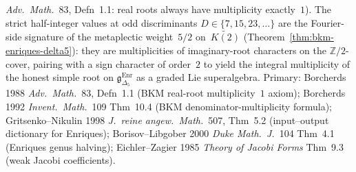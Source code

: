\begin{theorem}
\emph{Adv.~Math.}~83, Defn~1.1: real roots always have
multiplicity exactly~$1$). The strict half-integer values at
odd discriminants $D \in \{7, 15, 23, \ldots\}$ are the Fourier-side
signature of the metaplectic weight~$5/2$ on~$\widetilde{K(2)}$
(Theorem~\ref{thm:bkm-enriques-delta5}): they are multiplicities
of imaginary-root characters on the $\mathbb{Z}/2$-cover,
pairing with a sign character of order~$2$ to yield the integral
multiplicity of the honest simple root on
$\mathfrak{g}_{\Delta_5}^{\mathrm{Enr}}$ as a graded Lie superalgebra.
Primary:
Borcherds 1988 \emph{Adv.~Math.}~83, Defn~1.1 (BKM real-root
multiplicity~$1$ axiom);
Borcherds 1992 \emph{Invent.~Math.}~109 Thm~10.4 (BKM
denominator-multiplicity formula);
Gritsenko--Nikulin 1998 \emph{J.~reine angew.~Math.}~507, Thm~5.2
(input--output dictionary for Enriques);
Borisov--Libgober 2000 \emph{Duke Math.~J.}~104 Thm~4.1 (Enriques
genus halving);
Eichler--Zagier 1985 \emph{Theory of Jacobi Forms} Thm~9.3
(weak Jacobi coefficients).
\end{theorem}

